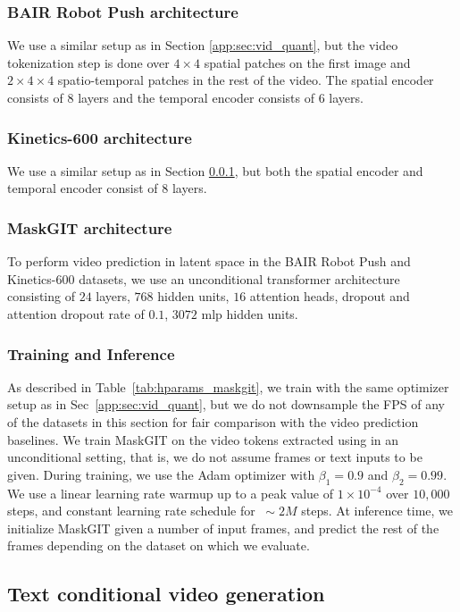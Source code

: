 \subsubsection{BAIR Robot Push \cvivit architecture} \label{app:sec:bair}
We use a similar setup as in Section \ref{app:sec:vid_quant}, but the video tokenization step is done over $4\times4$ spatial patches on the first image and $2\times4\times4$ spatio-temporal patches in the rest of the video. The spatial encoder consists of 8 layers and the temporal encoder consists of 6 layers.

\subsubsection{Kinetics-600 \cvivit architecture}
We use a similar setup as in Section \ref{app:sec:bair}, but both the spatial encoder and temporal encoder consist of 8 layers.

\subsubsection{MaskGIT architecture}
To perform video prediction in latent space in the BAIR Robot Push and Kinetics-600 datasets, we use an unconditional transformer architecture consisting of $24$ layers, $768$ hidden
units, $16$ attention heads, dropout and attention dropout rate of $0.1$, $3072$ mlp hidden units.

\subsubsection{Training and Inference}
As described in Table~\ref{tab:hparams_maskgit}, we train \cvivit with the same optimizer setup as in Sec~\ref{app:sec:vid_quant}, but we do not downsample the FPS of any of the datasets in this section for fair comparison with the video prediction baselines. We train MaskGIT on the video tokens extracted using \cvivit in an unconditional setting, that is, we do not assume frames or text inputs to be given. During training, we use the Adam \cite{adam} optimizer with $\beta_1=0.9$ and $\beta_2=0.99$. We use a linear learning rate warmup up to a peak value of $1\times10^{-4}$ over $10,000$ steps, and constant learning rate schedule for ${~\sim}2M$ steps. At inference time, we initialize MaskGIT given a number of input frames, and predict the rest of the frames depending on the dataset on which we evaluate.

\subsection{Text conditional video generation}
\label{app:sec:text2vid}

